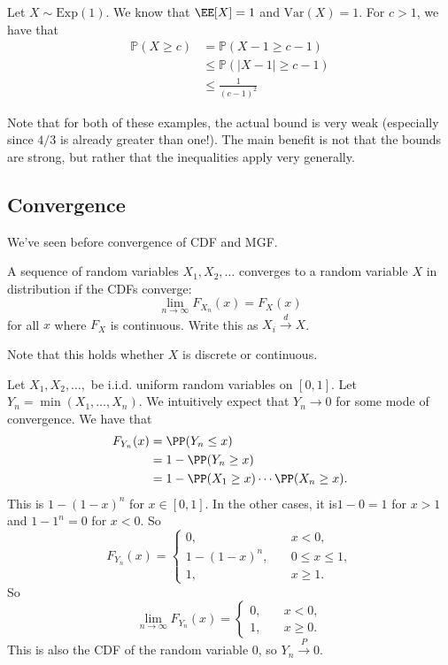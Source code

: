 \documentclass{ximera}
\begin{document}
\begin{example}
Let $X \sim \mathrm{Exp}(1)$. We know that $\EE[X]=1$ and $\mathrm{Var}(X)=1$. For $c>1$, we have that
\begin{equation*}
\begin{aligned} \mathbb{P}(X \geqslant c) &=\mathbb{P}(X-1 \geqslant c-1) \\ & \leqslant \mathbb{P}(|X-1| \geqslant c-1) \\ & \leqslant \frac{1}{(c-1)^{2}} \end{aligned}
\end{equation*}
\end{example}
Note that for both of these examples, the actual bound is very weak (especially since $4/3$ is already greater than one!). The main benefit is not that the bounds are strong, but rather that the inequalities apply very generally.

\subsection{Convergence}
We've seen before convergence of CDF and MGF. 

\begin{definition}
A sequence of random variables $X_1,X_2,\ldots$ converges to a random variable $X$ in distribution if the CDFs converge:
$$
\lim_{n\rightarrow \infty} F_{X_n}(x) = F_X(x)
$$
for all $x$ where $F_X$ is continuous. Write this as $X_i \stackrel{d}{\rightarrow} X$.
\end{definition}
Note that this holds whether $X$ is discrete or continuous.

\begin{example}
Let $X_1,X_2,\ldots,$ be i.i.d. uniform random variables on $[0,1]$. Let $Y_n = \min(X_1,\ldots,X_n)$. We intuitively expect that $Y_n \rightarrow 0$ for some mode of convergence. We have that
\begin{align*}
F_{Y_n}(x) &= \PP(Y_n \leq x)\\
&= 1 - \PP(Y_n \geq x)\\
&= 1 - \PP(X_1 \geq x)\cdots \PP(X_n \geq x).
\end{align*}
This is $1-(1-x)^n$ for $x \in [0,1]$. In the other cases, it is$1-0=1$ for $x > 1$ and $1-1^n=0$ for $ x<0$. So
$$
F_{Y_{n}}(x) = 
\begin{cases}
0, \quad & x < 0,\\
1-(1-x)^n, \quad & 0 \leq x \leq 1,\\
1, \quad & x \geq 1.
\end{cases}
$$
So 
$$
\lim_{n\rightarrow \infty} F_{Y_{n}}(x) = 
\begin{cases}
0, \quad & x < 0,\\
1, \quad & x \geq 0.
\end{cases}
$$
This is also the CDF of the random variable $0$, so $Y_n\stackrel{P}{\rightarrow} 0$.
\end{example}
\end{document}
